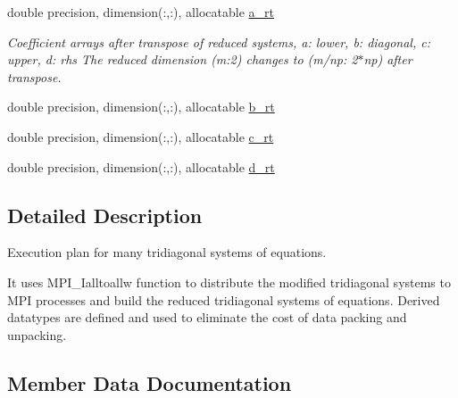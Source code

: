 \textbf{ }\par
\begin{DoxyCompactItemize}
\item 
double precision, dimension(\+:,\+:), allocatable \hyperlink{structpascal__tdma_1_1ptdma__plan__many_a42be039aee75c5393c22111cf232e77d}{a\+\_\+rt}
\begin{DoxyCompactList}\small\item\em Coefficient arrays after transpose of reduced systems, a\+: lower, b\+: diagonal, c\+: upper, d\+: rhs The reduced dimension (m\+:2) changes to (m/np\+: 2$\ast$np) after transpose. \end{DoxyCompactList}\item 
double precision, dimension(\+:,\+:), allocatable \hyperlink{structpascal__tdma_1_1ptdma__plan__many_aab84eff7c823d47acb5388cd4e2a790a}{b\+\_\+rt}
\item 
double precision, dimension(\+:,\+:), allocatable \hyperlink{structpascal__tdma_1_1ptdma__plan__many_a49336d53d19c274798e87ae33b530b33}{c\+\_\+rt}
\item 
double precision, dimension(\+:,\+:), allocatable \hyperlink{structpascal__tdma_1_1ptdma__plan__many_af0941ce4b9206c36a3a059d2bae84d2b}{d\+\_\+rt}
\end{DoxyCompactItemize}



\subsection{Detailed Description}
Execution plan for many tridiagonal systems of equations. 

It uses M\+P\+I\+\_\+\+Ialltoallw function to distribute the modified tridiagonal systems to M\+PI processes and build the reduced tridiagonal systems of equations. Derived datatypes are defined and used to eliminate the cost of data packing and unpacking. 

\subsection{Member Data Documentation}
\mbox{\label{structpascal__tdma_1_1ptdma__plan__many_a6d9101716eca623dc8c45075788f06bd}} 
